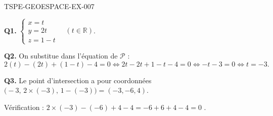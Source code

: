 \begin{corrige}{TSPE-GEOESPACE-EX-007}

\textbf{Q1.} $\begin{cases}x=t\\y=2t\\z=1-t\end{cases}\quad(t\in\mathbb{R})$.

\textbf{Q2.} On substitue dans l'équation de $\mathcal{P}$ :
\[
  2(t)-(2t)+(1-t)-4=0 \iff 2t-2t+1-t-4=0 \iff -t-3=0 \iff t=-3.
\]

\textbf{Q3.} Le point d'intersection a pour coordonnées $\big(-3,\,2\times(-3),\,1-(-3)\big) = (-3,-6,4)$.

Vérification : $2\times(-3)-(-6)+4-4 = -6+6+4-4=0$ \checkmark.

\end{corrige}
